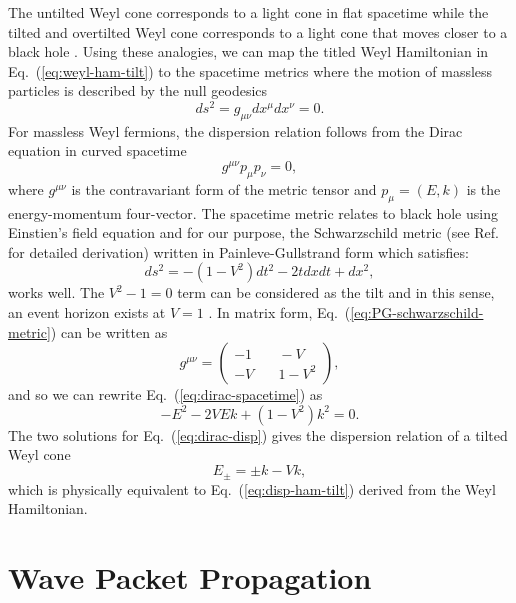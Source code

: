 \documentclass[%
 aip,
 amsmath,amssymb,
 reprint,%
]{revtex4-1}
\begin{document}
The untilted Weyl cone corresponds to a light cone in flat spacetime while the tilted and overtilted Weyl cone corresponds to a light cone that moves closer to a black hole  \cite{sabsovich2022}. Using these analogies, we can map the titled Weyl Hamiltonian in Eq.\ (\ref{eq:weyl-ham-tilt}) to the spacetime metrics where the motion of massless particles is described by the null geodesics
\begin{equation}
ds^2 = g_{\mu \nu} dx^{\mu} dx^{\nu} = 0.
\end{equation}
For massless Weyl fermions, the dispersion relation follows from the Dirac equation in curved spacetime
\begin{equation}
  \label{eq:dirac-spacetime}
g^{\mu \nu} p_{\mu} p_{\nu}= 0,
\end{equation}
where $g^{\mu \nu}$ is the contravariant form of the metric tensor and $p_{\mu} = (E,k)$ is the energy-momentum four-vector. The spacetime metric relates to black hole using Einstien's field equation \cite{einstein1915} and for our purpose, the Schwarzschild metric (see Ref.~ for detailed derivation) written in Painleve-Gullstrand form which satisfies:
\begin{equation}
  \label{eq:PG-schwarzschild-metric}
  ds^2=-(1 - V^2)dt^2 - 2tdxdt + dx^2,
\end{equation}
works well. The $V^2 - 1=0$ term can be considered as the tilt and in this sense, an event horizon exists at $V=1$ \cite{kedem2020}. In matrix form, Eq.\ (\ref{eq:PG-schwarzschild-metric}) can be written as
\begin{equation}
g^{\mu \nu} = \begin{pmatrix} -1 & \quad -V  \\ -V & \quad  1-V^2 \end{pmatrix},
\end{equation}
and so we can rewrite Eq.\ (\ref{eq:dirac-spacetime}) as
\begin{equation}
  \label{eq:dirac-disp}
  -E^2 - 2VEk + (1 - V^2)k^2=0.
\end{equation}
The two solutions for Eq.~(\ref{eq:dirac-disp}) gives the dispersion relation of a tilted Weyl cone
\begin{equation}
E_{\pm} = \pm k - Vk,
\end{equation}
which is physically equivalent to Eq.\ (\ref{eq:disp-ham-tilt}) derived from the Weyl Hamiltonian.

\section{\label{sec:wave-packet-prop}Wave Packet Propagation}
\end{document}
